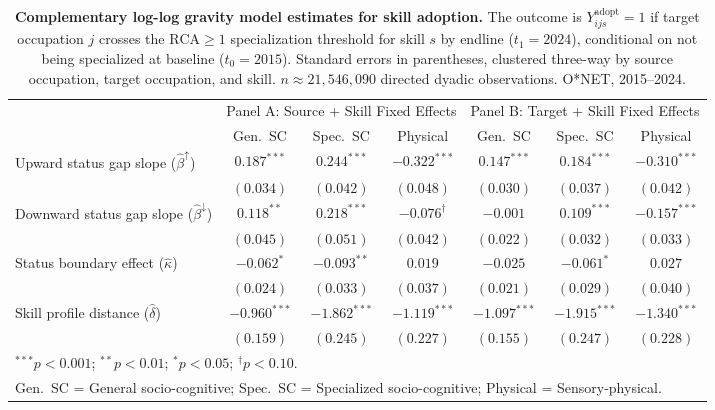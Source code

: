 \begin{table}[H]
\centering
\caption{\textbf{Complementary log-log gravity model estimates for skill adoption.} The outcome is $Y^{\mathrm{adopt}}_{ijs} = 1$ if target occupation $j$ crosses the $\mathrm{RCA} \geq 1$ specialization threshold for skill $s$ by endline ($t_1 = 2024$), conditional on not being specialized at baseline ($t_0 = 2015$). Standard errors in parentheses, clustered three-way by source occupation, target occupation, and skill. $n \approx 21{,}546{,}090$ directed dyadic observations. O*NET, 2015--2024.}
\label{tab:SI_coef_adopt}
\renewcommand{\arraystretch}{1.2}
\begin{tabular}{lcccccc}
\toprule
 & \multicolumn{3}{c}{Panel A: Source + Skill Fixed Effects}
 & \multicolumn{3}{c}{Panel B: Target + Skill Fixed Effects} \\
\cmidrule(lr){2-4} \cmidrule(lr){5-7}
 & Gen.\ SC & Spec.\ SC & Physical
 & Gen.\ SC & Spec.\ SC & Physical \\
\midrule
Upward status gap slope ($\hat{\beta}^{\uparrow}$)
  & $0.187^{***}$ & $0.244^{***}$ & $-0.322^{***}$
  & $0.147^{***}$ & $0.184^{***}$ & $-0.310^{***}$ \\
  & $(0.034)$ & $(0.042)$ & $(0.048)$
  & $(0.030)$ & $(0.037)$ & $(0.042)$ \\[4pt]
Downward status gap slope ($\hat{\beta}^{\downarrow}$)
  & $0.118^{**}$ & $0.218^{***}$ & $-0.076^{\dagger}$
  & $-0.001$ & $0.109^{***}$ & $-0.157^{***}$ \\
  & $(0.045)$ & $(0.051)$ & $(0.042)$
  & $(0.022)$ & $(0.032)$ & $(0.033)$ \\[4pt]
Status boundary effect ($\hat{\kappa}$)
  & $-0.062^{*}$ & $-0.093^{**}$ & $0.019$
  & $-0.025$ & $-0.061^{*}$ & $0.027$ \\
  & $(0.024)$ & $(0.033)$ & $(0.037)$
  & $(0.021)$ & $(0.029)$ & $(0.040)$ \\[4pt]
Skill profile distance ($\hat{\delta}$)
  & $-0.960^{***}$ & $-1.862^{***}$ & $-1.119^{***}$
  & $-1.097^{***}$ & $-1.915^{***}$ & $-1.340^{***}$ \\
  & $(0.159)$ & $(0.245)$ & $(0.227)$
  & $(0.155)$ & $(0.247)$ & $(0.228)$ \\
\bottomrule
\multicolumn{7}{l}{\footnotesize $^{***}p<0.001$; $^{**}p<0.01$; $^{*}p<0.05$; $^{\dagger}p<0.10$.} \\
\multicolumn{7}{l}{\footnotesize Gen.~SC = General socio-cognitive; Spec.~SC = Specialized socio-cognitive; Physical = Sensory-physical.}
\end{tabular}
\end{table}
